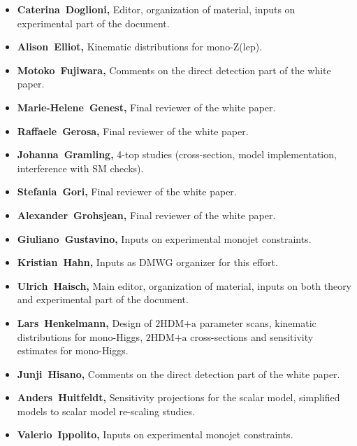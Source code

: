 \documentclass[a4paper, 11pt,notoc]{article}
\newcommand{\hdma}{\ensuremath{\textrm{2HDM+a}}\xspace}
\begin{document}
\begin{itemize}
\item \textbf{Caterina~Doglioni,} Editor, organization of material, inputs on experimental part of the document. 

\item \textbf{Alison~Elliot,} Kinematic distributions for mono-Z(lep). 

\item \textbf{Motoko~Fujiwara,} Comments on the direct detection part of the white paper. 

\item \textbf{Marie-Helene~Genest,} Final reviewer of the white paper. 

\item \textbf{Raffaele~Gerosa,} Final reviewer of the white paper. 

\item \textbf{Johanna~Gramling,} 4-top studies (cross-section, model implementation, interference with SM checks).

\item \textbf{Stefania~Gori,} Final reviewer of the white paper. 

\item \textbf{Alexander~Grohsjean,} Final reviewer of the white paper. 

\item \textbf{Giuliano~Gustavino,} Inputs on experimental monojet constraints. 

\item \textbf{Kristian~Hahn,} Inputs as DMWG organizer for this effort. 

\item \textbf{Ulrich~Haisch,} Main editor, organization of material, inputs on both theory and experimental part of the document. 
 
\item \textbf{Lars~Henkelmann,} Design of \hdma parameter scans,  kinematic distributions for mono-Higgs, \hdma cross-sections and sensitivity estimates for mono-Higgs.

\item \textbf{Junji~Hisano,} Comments on the direct detection part of the white paper. 

\item \textbf{Anders~Huitfeldt,} Sensitivity projections for the scalar model, simplified models to scalar model re-scaling studies. 

\item \textbf{Valerio~Ippolito,} Inputs on experimental monojet constraints. 


\end{itemize}
\end{document}
